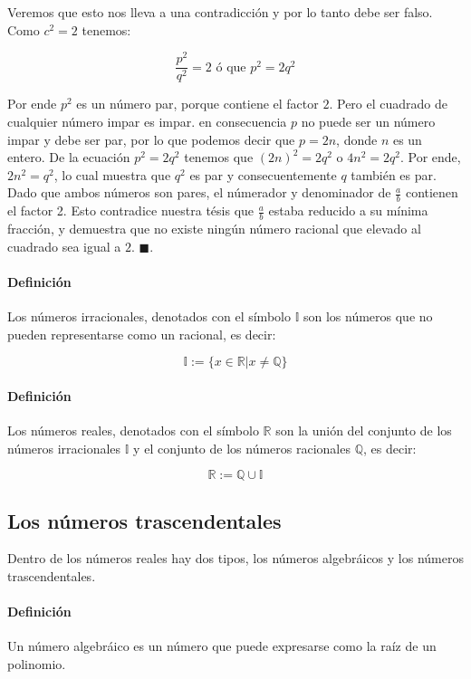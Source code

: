 \documentclass{article}
\begin{document}
Veremos que esto nos lleva a una contradicción y por lo tanto debe ser falso. Como $c^2 = 2$ tenemos:

$$\frac{p^2}{q^2} = 2 \text{ ó que } p^2 = 2q^2$$

Por ende $p^2$ es un número par, porque contiene el factor $2$. Pero el cuadrado de cualquier número impar es impar. en consecuencia $p$ no puede ser un número impar y debe ser par, por lo que podemos decir que $p = 2n$, donde $n$ es un entero. De la ecuación $p^2 = 2q^2$ tenemos que $(2n)^2 = 2q^2$ o $4n^2 = 2q^2$. Por ende, $2n^2 = q^2$, lo cual muestra que $q^2$ es par y consecuentemente $q$ también es par. Dado que ambos números son pares, el númerador y denominador de $\frac{a}{b}$ contienen el factor 2. Esto contradice nuestra tésis que $\frac{a}{b}$ estaba reducido a su mínima fracción, y demuestra que no existe ningún número racional que elevado al cuadrado sea igual a $2$. $\blacksquare$.

\paragraph{Definición} Los números irracionales, denotados con el símbolo $\mathbb{I}$ son los números que no pueden representarse como un racional, es decir:

$$\mathbb{I} := \{x \in \mathbb{R} | x \neq \mathbb{Q} \}$$

\paragraph{Definición} Los números reales, denotados con el símbolo $\mathbb{R}$ son la unión del conjunto de los números irracionales $\mathbb{I}$ y el conjunto de los números racionales $\mathbb{Q}$, es decir:

$$\mathbb{R} := \mathbb{Q} \cup \mathbb{I} $$

\subsection{Los números trascendentales}

Dentro de los números reales hay dos tipos, los números algebráicos y los números trascendentales.

\paragraph{Definición} Un número algebráico es un número que puede expresarse como la raíz de un polinomio.
\end{document}

